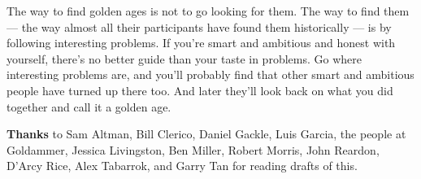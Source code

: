 The way to find golden ages is not to go looking for them. The way to
find them --- the way almost all their participants have found them
historically --- is by following interesting problems. If you're smart
and ambitious and honest with yourself, there's no better guide than
your taste in problems. Go where interesting problems are, and you'll
probably find that other smart and ambitious people have turned up there
too. And later they'll look back on what you did together and call it a
golden age.


\textbf{Thanks} to Sam Altman, Bill Clerico, Daniel Gackle, Luis Garcia,
the people at Goldammer, Jessica Livingston, Ben Miller, Robert Morris,
John Reardon, D'Arcy Rice, Alex Tabarrok, and Garry Tan for reading
drafts of this.